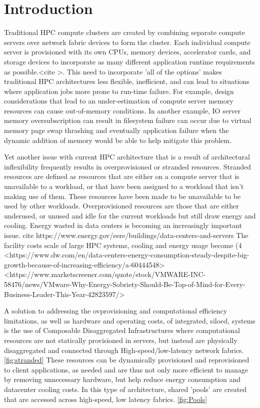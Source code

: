 \section{Introduction}

Traditional HPC compute clusters are created by combining separate compute servers over network fabric devices to form the cluster.  Each individual compute server is provisioned with its own CPUs, memory devices, accelerator cards, and storage devices to incorporate as many different application runtime requirements as possible.<cite >. This need to incorporate 'all of the options' makes traditional HPC architectures less flexible, inefficient, and can lead to situations where application jobs more prone to run-time failure.    
For example, design considerations that lead to an under-estimation of compute server memory resources can cause out-of-memory conditions.  In another example, IO server memory oversubscription can result in filesystem failure can occur due to virtual memory page swap thrashing and eventually application failure when the dynamic addition of memory would be able to help mitigate this problem.  

Yet another issue with current HPC architecture that is a result of architectural inflexibility frequently results in overprovisioned or stranded resources.  Stranded resources are defined as resources that are either on a compute server that is unavailable to a workload, or that have been assigned to a workload that isn't making use of them.  These resources have been made to be unavailable to be used by other workloads. Overprovisioned resources are those that are either underused, or unused and idle for the current workloads but still draw energy and cooling.  Energy wasted in data centers is becoming an increasingly important issue.  {cite https://www.energy.gov/eere/buildings/data-centers-and-servers } 
The facility costs scale of large HPC systems, cooling and energy usage become  
  (4%
  <https://www.dw.com/en/data-centers-energy-consumption-steady-despite-big-growth-because-of-increasing-efficiency/a-60444548>
  <https://www.marketscreener.com/quote/stock/VMWARE-INC-58476/news/VMware-Why-Energy-Sobriety-Should-Be-Top-of-Mind-for-Every-Business-Leader-This-Year-42823597/>

A solution to addressing the ovprovisioning and computational efficiency limitations, as well as hardware and operating costs, of integrated, siloed, systems is the use of Composable Disaggregated Infrastructures where computational resources are not statically provisioned in servers, but instead are physically disaggregated and connected through High-speed/low-latency network fabrics.  \ref{fig:stranded}  These resources can be dynamically provisioned and reprovisioned to client applications, as needed and are thus not only more efficient to manage by removing unnecessary hardware, but help reduce energy consumption and datacenter cooling costs.  In this type of architecture, shared 'pools' are created that are accessed across high-speed, low latency fabrics. \ref{fig:Pools}


